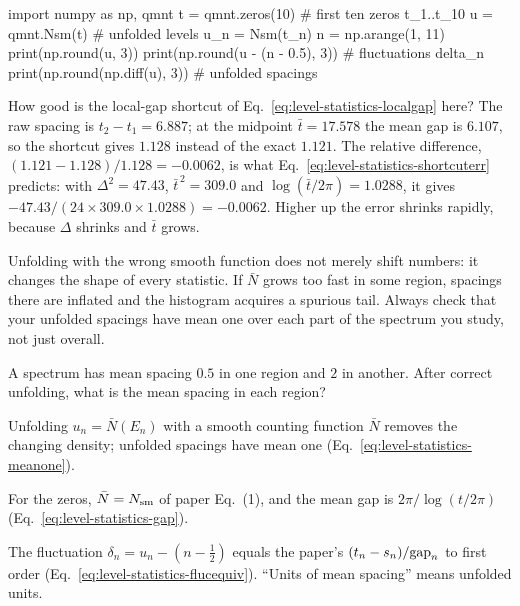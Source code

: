 \begin{pycode}
import numpy as np, qmnt
t = qmnt.zeros(10)               # first ten zeros t_1..t_10
u = qmnt.Nsm(t)                  # unfolded levels u_n = Nsm(t_n)
n = np.arange(1, 11)
print(np.round(u, 3))
print(np.round(u - (n - 0.5), 3))   # fluctuations delta_n
print(np.round(np.diff(u), 3))      # unfolded spacings
\end{pycode}

How good is the local-gap shortcut of Eq.~\eqref{eq:level-statistics-localgap} here? The raw spacing is $t_2-t_1=6.887$; at the midpoint $\bar t=17.578$ the mean gap is $6.107$, so the shortcut gives $1.128$ instead of the exact $1.121$. The relative difference, $(1.121-1.128)/1.128=-0.0062$, is what Eq.~\eqref{eq:level-statistics-shortcuterr} predicts: with $\Delta^2=47.43$, $\bar t^{\,2}=309.0$ and $\log(\bar t/2\pi)=1.0288$, it gives $-47.43/(24\times309.0\times1.0288)=-0.0062$. Higher up the error shrinks rapidly, because $\Delta$ shrinks and $\bar t$ grows.

\begin{pitfall}
Unfolding with the wrong smooth function does not merely shift numbers: it changes the shape of every statistic. If $\bar N$ grows too fast in some region, spacings there are inflated and the histogram acquires a spurious tail. Always check that your unfolded spacings have mean one over each part of the spectrum you study, not just overall.
\end{pitfall}

\begin{checkpoint}
A spectrum has mean spacing $0.5$ in one region and $2$ in another. After correct unfolding, what is the mean spacing in each region?
\end{checkpoint}

\begin{keyideas}
\item Unfolding $u_n=\bar N(E_n)$ with a smooth counting function $\bar N$ removes the changing density; unfolded spacings have mean one (Eq.~\eqref{eq:level-statistics-meanone}).
\item For the zeros, $\bar N=N_{\mathrm{sm}}$ of paper Eq.~(1), and the mean gap is $2\pi/\log(t/2\pi)$ (Eq.~\eqref{eq:level-statistics-gap}).
\item The fluctuation $\delta_n=u_n-(n-\tfrac12)$ equals the paper's $(t_n-s_n)/\mathrm{gap}_n$ to first order (Eq.~\eqref{eq:level-statistics-flucequiv}). ``Units of mean spacing'' means unfolded units.
\end{keyideas}

